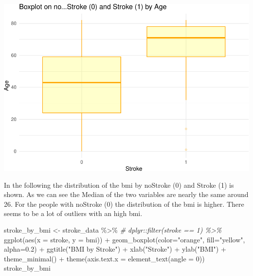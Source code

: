 \documentclass[
]{article}
\newenvironment{Shaded}{\begin{snugshade}}{\end{snugshade}}
\newcommand{\AttributeTok}[1]{\textcolor[rgb]{0.77,0.63,0.00}{#1}}
\newcommand{\CommentTok}[1]{\textcolor[rgb]{0.56,0.35,0.01}{\textit{#1}}}
\newcommand{\DecValTok}[1]{\textcolor[rgb]{0.00,0.00,0.81}{#1}}
\newcommand{\FloatTok}[1]{\textcolor[rgb]{0.00,0.00,0.81}{#1}}
\newcommand{\FunctionTok}[1]{\textcolor[rgb]{0.00,0.00,0.00}{#1}}
\newcommand{\NormalTok}[1]{#1}
\newcommand{\OtherTok}[1]{\textcolor[rgb]{0.56,0.35,0.01}{#1}}
\newcommand{\SpecialCharTok}[1]{\textcolor[rgb]{0.00,0.00,0.00}{#1}}
\newcommand{\StringTok}[1]{\textcolor[rgb]{0.31,0.60,0.02}{#1}}
\renewcommand{\=}[1]{\stackrel{#1}{=}}
\theoremstyle{definition}
\theoremstyle{remark}
\begin{document}
\includegraphics{sioux_mach_learn_project_files/figure-latex/unnamed-chunk-17-1.pdf}

In the following the distribution of the bmi by noStroke (0) and Stroke (1) is shown. As we can see the Median of the two variables are nearly the same around 26. For the people with noStroke (0) the distribution of the bmi is higher. There seems to be a lot of outliers with an high bmi.

\begin{Shaded}
\begin{Highlighting}[]
\NormalTok{stroke\_by\_bmi }\OtherTok{\textless{}{-}}\NormalTok{ stroke\_data }\SpecialCharTok{\%\textgreater{}\%}
\CommentTok{\# dplyr::filter(stroke == 1) \%\textgreater{}\%}
 \FunctionTok{ggplot}\NormalTok{(}\FunctionTok{aes}\NormalTok{(}\AttributeTok{x =}\NormalTok{ stroke,}
            \AttributeTok{y =}\NormalTok{ bmi)) }\SpecialCharTok{+}
  \FunctionTok{geom\_boxplot}\NormalTok{(}\AttributeTok{color=}\StringTok{"orange"}\NormalTok{, }\AttributeTok{fill=}\StringTok{"yellow"}\NormalTok{, }\AttributeTok{alpha=}\FloatTok{0.2}\NormalTok{) }\SpecialCharTok{+}
  \FunctionTok{ggtitle}\NormalTok{(}\StringTok{"BMI by Stroke"}\NormalTok{) }\SpecialCharTok{+} 
  \FunctionTok{xlab}\NormalTok{(}\StringTok{"Stroke"}\NormalTok{) }\SpecialCharTok{+} \FunctionTok{ylab}\NormalTok{(}\StringTok{"BMI"}\NormalTok{) }\SpecialCharTok{+}
  \FunctionTok{theme\_minimal}\NormalTok{() }\SpecialCharTok{+} \FunctionTok{theme}\NormalTok{(}\AttributeTok{axis.text.x =} \FunctionTok{element\_text}\NormalTok{(}\AttributeTok{angle =} \DecValTok{0}\NormalTok{))}
\NormalTok{stroke\_by\_bmi}
\end{Highlighting}
\end{Shaded}
\end{document}
